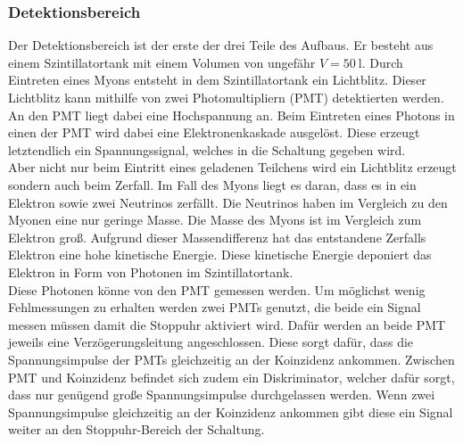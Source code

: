 \subsubsection{Detektionsbereich}
Der Detektionsbereich ist der erste der drei Teile des Aufbaus.
Er besteht aus einem Szintillatortank mit einem Volumen von ungefähr $V = \SI{50}{\litre}$.
Durch Eintreten eines Myons entsteht in dem Szintillatortank ein Lichtblitz.
Dieser Lichtblitz kann mithilfe von zwei Photomultipliern (PMT) detektierten werden.
An den PMT liegt dabei eine Hochspannung an.
Beim Eintreten eines Photons in einen der PMT wird dabei eine Elektronenkaskade ausgelöst.
Diese erzeugt letztendlich ein Spannungssignal, welches in die Schaltung gegeben wird.\\
Aber nicht nur beim Eintritt eines geladenen Teilchens wird ein Lichtblitz erzeugt sondern auch beim Zerfall.
Im Fall des Myons liegt es daran, dass es in ein Elektron  sowie zwei Neutrinos zerfällt.
Die Neutrinos haben im Vergleich zu den Myonen eine nur geringe Masse.
Die Masse des Myons ist im Vergleich zum Elektron groß.
Aufgrund dieser Massendifferenz hat das entstandene Zerfalls Elektron eine hohe kinetische Energie.
Diese kinetische Energie deponiert das Elektron in Form von Photonen im Szintillatortank.\\
Diese Photonen könne von den PMT gemessen werden.
Um möglichst wenig Fehlmessungen zu erhalten werden zwei PMTs genutzt, die beide ein Signal messen müssen damit die Stoppuhr aktiviert wird.
Dafür werden an beide PMT jeweils eine Verzögerungsleitung angeschlossen.
Diese sorgt dafür, dass die Spannungsimpulse der PMTs gleichzeitig an der Koinzidenz ankommen.
Zwischen PMT und Koinzidenz befindet sich zudem ein Diskriminator, welcher dafür sorgt, dass nur genügend große Spannungsimpulse durchgelassen werden.
Wenn zwei Spannungsimpulse gleichzeitig an der Koinzidenz ankommen gibt diese ein Signal weiter an den Stoppuhr-Bereich der Schaltung.
